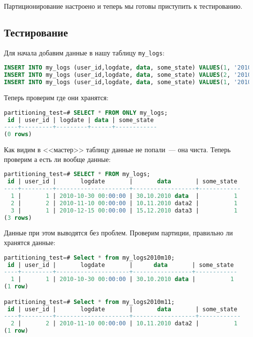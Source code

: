 Партиционирование настроено и теперь мы готовы приступить к тестированию.

\subsection{Тестирование}

Для начала добавим данные в нашу таблицу \lstinline!my_logs!:

\begin{lstlisting}[language=SQL,label=lst:partitioning7,caption=Данные]
INSERT INTO my_logs (user_id,logdate, data, some_state) VALUES(1, '2010-10-30', '30.10.2010 data', 1);
INSERT INTO my_logs (user_id,logdate, data, some_state) VALUES(2, '2010-11-10', '10.11.2010 data2', 1);
INSERT INTO my_logs (user_id,logdate, data, some_state) VALUES(1, '2010-12-15', '15.12.2010 data3', 1);
\end{lstlisting}

Теперь проверим где они хранятся:

\begin{lstlisting}[language=SQL,label=lst:partitioning8,caption=<<Мастер>> таблица чиста]
partitioning_test=# SELECT * FROM ONLY my_logs;
 id | user_id | logdate | data | some_state
----+---------+---------+------+------------
(0 rows)
\end{lstlisting}

Как видим в <<мастер>> таблицу данные не попали~--- она чиста. Теперь проверим а есть ли вообще данные:

\begin{lstlisting}[language=SQL,label=lst:partitioning9,caption=Проверка данных]
partitioning_test=# SELECT * FROM my_logs;
 id | user_id |       logdate       |       data       | some_state
----+---------+---------------------+------------------+------------
  1 |       1 | 2010-10-30 00:00:00 | 30.10.2010 data  |          1
  2 |       2 | 2010-11-10 00:00:00 | 10.11.2010 data2 |          1
  3 |       1 | 2010-12-15 00:00:00 | 15.12.2010 data3 |          1
(3 rows)
\end{lstlisting}

Данные при этом выводятся без проблем. Проверим партиции, правильно ли хранятся данные:

\begin{lstlisting}[language=SQL,label=lst:partitioning10,caption=Проверка хранения данных]
partitioning_test=# Select * from my_logs2010m10;
 id | user_id |       logdate       |      data       | some_state
----+---------+---------------------+-----------------+------------
  1 |       1 | 2010-10-30 00:00:00 | 30.10.2010 data |          1
(1 row)

partitioning_test=# Select * from my_logs2010m11;
 id | user_id |       logdate       |       data       | some_state
----+---------+---------------------+------------------+------------
  2 |       2 | 2010-11-10 00:00:00 | 10.11.2010 data2 |          1
(1 row)
\end{lstlisting}

